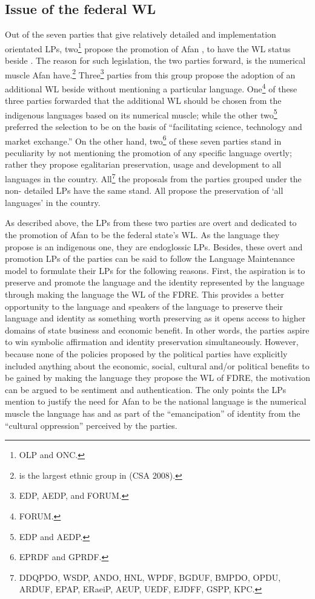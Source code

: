 \documentclass[output=paper,modfonts]{langscibook}
\begin{document}
\subsection{Issue of the federal WL} 
Out of the seven parties that give relatively detailed and implementation orientated LPs, two\footnote{OLP and ONC.} propose the promotion of Afan , to have the WL status beside . The reason for such legislation, the two parties forward, is the numerical muscle Afan  have.\footnote{ is the largest ethnic group in  (CSA 2008).} Three\footnote{EDP, AEDP, and FORUM.} parties from this group propose the adoption of an additional WL beside  without mentioning a particular language. One\footnote{FORUM.} of these three parties forwarded that the additional WL should be chosen from the indigenous languages based on its numerical muscle; while the other two\footnote{EDP and AEDP.} preferred the selection to be on the basis of “facilitating science, technology and market exchange.” On the other hand, two\footnote{EPRDF and GPRDF.} of these seven parties stand in peculiarity by not mentioning the promotion of any specific language overtly; rather they propose egalitarian preservation, usage and development to all languages in the country. All\footnote{DDQPDO, WSDP, ANDO, HNL, WPDF, BGDUF, BMPDO, OPDU, ARDUF, EPAP, ERaeiP, AEUP, UEDF, EJDFF, GSPP, KPC.} the proposals from the parties grouped under the non- detailed LPs have the same stand. All propose the preservation of ‘all languages’ in the country. 

As described above, the LPs from these two parties are overt and dedicated to the promotion of Afan  to be the federal state’s WL. As the language they propose is an indigenous one, they are endoglossic LPs. Besides, these overt and promotion LPs of the parties can be said to follow the Language Maintenance model to formulate their LPs for the following reasons. First, the aspiration is to preserve and promote the language and the identity represented by the language through making the language the WL of the FDRE. This provides a better opportunity to the language and speakers of the language to preserve their language and identity as something worth preserving as it opens access to higher domains of state business and economic benefit. In other words, the parties aspire to win symbolic affirmation and identity preservation simultaneously. However, because none of the policies proposed by the political parties have explicitly included anything about the economic, social, cultural and/or political benefits to be gained by making the language they propose the WL of FDRE, the motivation can be argued to be sentiment and authentication. The only points the LPs mention to justify the need for Afan  to be the national language is the numerical muscle the language has and as part of the “emancipation” of  identity from the “cultural oppression” perceived by the parties. 
\end{document}
